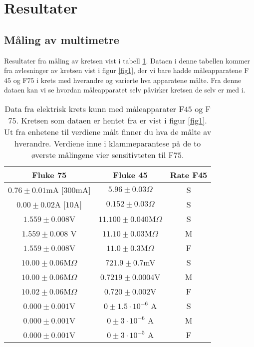 \documentclass[%
 reprint,
 amsmath,amssymb,
 aps,
]{revtex4-1}
\begin{document}
\section{Resultater}
\subsection{Måling av multimetre}
Resultater fra måling av kretsen vist i tabell \ref{table1}. Dataen i denne tabellen kommer fra avlesninger av kretsen vist i figur \ref{fig1}, der vi bare hadde måleapparatene F$45$ og F$75$ i krets med hverandre og varierte hva apparatene målte. Fra denne dataen kan vi se hvordan måleapparatet selv påvirker kretsen de selv er med i. \\
\begin{table}[h!]
\caption{Data fra elektrisk krets kunn med måleapparater  F$45$ og F$75$. Kretsen som dataen er hentet fra er vist i figur \ref{fig1}. Ut fra enhetene til verdiene målt finner du hva de målte av hverandre. Verdiene inne i klammeparantese på de to øverste målingene vier sensitivteten til F$75$.}\centering
\label{table1}
\begin{tabular}{c c c}
\toprule
Fluke 75                 & Fluke 45                  & Rate F45 \\
\hline
$0.76 \pm  0.01$mA $[300$mA$]$       & $5.96 \pm 0.03 \Omega$ & S           \\
$0.00 \pm 0.02 $A $[10$A$]$       & $0.152 \pm 0.03 \Omega$  & S \\
$1.559 \pm 0.008$V       & $11.100 \pm 0.040 $M$\Omega$    & S        \\
$1.559 \pm 0.008$ V      & $11.10 \pm 0.03$M$\Omega$ & M        \\
$1.559 \pm 0.008$V       & $11.0 \pm 0.3 $M$\Omega$    & F        \\
$10.00 \pm 0.06$M$\Omega$  & $721.9 \pm 0.7 $mV       & S        \\
$10.00 \pm 0.06$M$\Omega$ & $0.7219 \pm 0.0004 $V   & M        \\
$10.02 \pm 0.06$M$\Omega$  & $0.720 \pm0.002$V         & F        \\
$0.000 \pm 0.001$V       & $0 \pm 1.5 \cdot 10^{-6}$ A     & S        \\
$0.000 \pm 0.001$V       & $0  \pm 3 \cdot 10^{-6}$ A      & M        \\
$0.000 \pm 0.001$V       & $0 \pm 3 \cdot 10^{-5}$ A       & F    \\
\end{tabular}
\end{table}
\end{document}
